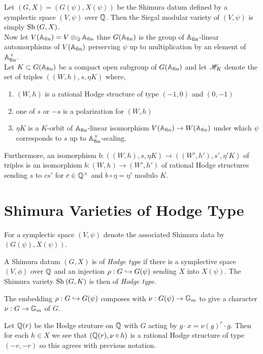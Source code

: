 \documentclass[12pt]{article}
\begin{document}
Let $(G, X) = (G(\psi), X(\psi))$ be the Shimura datum defined by a symplectic space $(V, \psi)$ over $\mathbb{Q}$. Then the Siegal modular variety of $(V, \psi)$ is simply $\mathrm{Sh}_{} \left( G, X \right)$.
\bigskip\\
Now let $V(\mathbb{A}_{\mathrm{fin}}) = V \otimes_{\mathbb{Q}} \mathbb{A}_{\mathrm{fin}}$ thne $G(\mathbb{A}_{\mathrm{fin}})$ is the group of $\mathbb{A}_{\mathrm{fin}}$-linear automorphisms of $V(\mathbb{A}_{\mathrm{fin}})$ perserving $\psi$ up to multiplication by an element of $\mathbb{A}_{\mathrm{fin}}^\times$.
\bigskip\\
Let $K \subset G(\mathbb{A}_{\mathrm{fin}})$ be a compact open subgroup of $G(\mathbb{A}_{\mathrm{fin}})$ and let $\mathscr{H}_K$ denote the set of triples $((W, h), s, \eta K)$ where,
\begin{enumerate}
\item $(W, h)$ is a rational Hodge structure of type $(-1,0)$ and $(0, -1)$
\item one of $s$ or $-s$ is a polarization for $(W, h)$
\item $\eta K$ is a $K$-orbit of $\mathbb{A}_{\mathrm{fin}}$-linear isomorphism $V(\mathbb{A}_{\mathrm{fin}}) \to W(\mathbb{A}_{\mathrm{fin}})$ under which $\psi$ corresponds to $s$ up to $\mathbb{A}_{\mathrm{fin}}^\times$-scaling.
\end{enumerate}
Furthermore, an isomorphism $b : ((W, h), s, \eta K) \to ((W', h'), s', \eta'K)$ of triples is an isomorphism $b : (W, h) \to (W', h')$ of rational Hodge structures sending $s$ to $cs'$ for $c \in \mathbb{Q}^\times$ and $b \circ \eta = \eta'$ modulo $K$.

\section{Shimura Varieties of Hodge Type}

\begin{rmk}
For a symplectic space $(V, \psi)$ denote the associated Shimura data by $(G(\psi), X(\psi))$.
\end{rmk}

\begin{defn}
A Shimura datum $(G, X)$ is of \textit{Hodge type} if there is a symplective space $(V, \phi)$ over $\mathbb{Q}$ and an injection $\rho : G \hookrightarrow G(\psi)$ sending $X$ into $X(\psi)$. The Shimura variety $\mathrm{Sh}_{} \left( G, K \right)$ is then of \textit{Hodge type}. 
\end{defn}

\begin{rmk}
The embedding $\rho : G \hookrightarrow G(\psi)$ composes with $\nu : G(\psi) \to \mathbb{G}_m$ to give a character $\nu : G \to \mathbb{G}_m$ of $G$.
\end{rmk}

\begin{prop}
Let $\mathbb{Q}(r)$ be the Hodge struture on $\mathbb{Q}$ with $G$ acting by $g \cdot x = \nu(g)^r \cdot g$. Then for each $h \in X$ we see that $(\mathbb{Q}(r), \nu \circ h)$ is a rational Hodge structure of type $(-r,-r)$ so this agrees with previous notation.
\end{prop}
\end{document}
